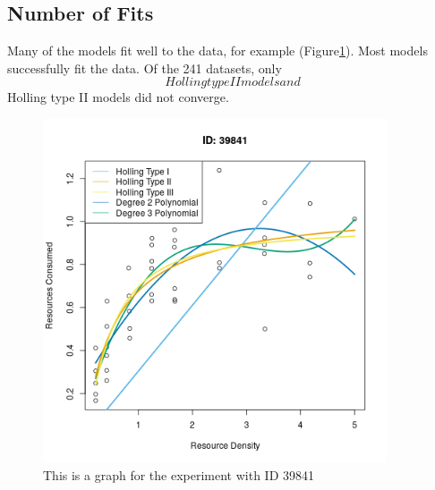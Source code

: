 \documentclass{article}
\begin{document}
\subsection{Number of Fits}
Many of the models fit well to the data, for example (Figure\ref{fig:2}). Most models successfully fit the data. Of the 241 datasets, only $$ Holling type II models and $$ Holling type II models did not converge.  %
\begin{figure}[h!] %
    \centering
    \includegraphics[width=4in]{../Results/Plots/39841.png}
    \caption{This is a graph for the experiment with ID 39841}
    \label{fig:2}
\end{figure}
\end{document}

